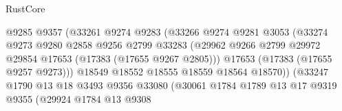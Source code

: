 \begin{lexlean}{RustCore}
\begin{coremodule}
                                          @9285
                                          @9357
                                          (@33261
                                            @9274
                                            @9283
                                            (@33266
                                              @9274
                                              @9281
                                              @3053
                                              (@33274
                                                @9273
                                                @9280
                                                @2858
                                                @9256
                                                @2799
                                                @33283
                                                (@29962
                                                  @9266
                                                  @2799
                                                  @29972
                                                  @29854
                                                  @17653
                                                  (@17383 (@17655 @9267 @2805)))
                                                @17653
                                                (@17383 (@17655 @9257 @9273)))
                                              @18549
                                              @18552
                                              @18555
                                              @18559
                                              @18564
                                              @18570))
                                          (@33247
                                            @1790
                                            @13
                                            @18
                                            @3493
                                            @9356
                                            @33080
                                            (@30061
                                              @1784
                                              @1789
                                              @13
                                              @17
                                              @9319
                                              @9355
                                              (@29924
                                                @1784
                                                @13
                                                @9308

\end{coremodule}
\end{lexlean}

